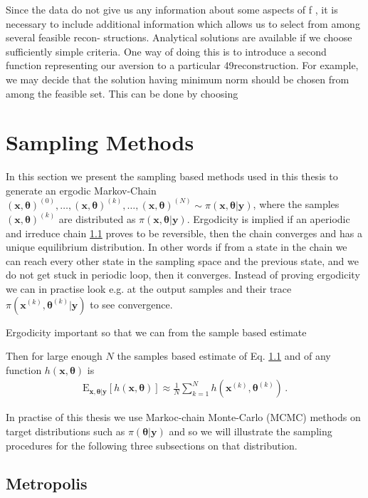 Since the data do not give us any information about some aspects of f , it is necessary to
include additional information which allows us to select from among several feasible recon-
structions. Analytical solutions are available if we choose sufficiently simple criteria. One way
of doing this is to introduce a second function representing our aversion to a particular
49reconstruction. For example, we may decide that the solution having minimum norm should
be chosen from among the feasible set. This can be done by choosing



\section{Sampling Methods}
In this section we present the sampling based methods used in this thesis to generate an ergodic Markov-Chain $ (\bm{x}, \bm{\theta} )^{(0)}, \dots, (\bm{x}, \bm{\theta} )^{(k)} , \dots,  (\bm{x}, \bm{\theta})^{(N)} \sim \pi(\bm{x},\bm{\theta}| \bm{y}) $, where the samples $(\bm{x}, \bm{\theta} )^{(k)}$ are distributed as $\pi(\bm{x},\bm{\theta}| \bm{y}) $.
Ergodicity is implied if an aperiodic and irreduce chain \ref{} proves to be reversible, then the chain converges and has a unique  equilibrium distribution.
In other words if from a state in the chain we can reach every other state in the sampling space and the previous state, and we do not get stuck in periodic loop, then it converges.
Instead of proving ergodicity we can in practise look e.g. at the output samples and their trace $\pi(\bm{x}^{(k)},\bm{\theta}^{(k)}| \bm{y})$ to see convergence.

Ergodicity important so that we can from the sample based estimate

Then for large enough $N$ the samples based estimate of Eq. \ref{} and of any function $h(\bm{x}, \bm{\theta})$ is
\begin{align}
	\label{eq:sampMean}
	\text{E}_{\bm{x},\bm{\theta}|\bm{y}} [h(\bm{x}, \bm{\theta})] \approx \frac{1}{N} \sum_{k=1}^{N} h(\bm{x}^{(k)},\bm{\theta}^{(k)}) \, .
\end{align}

In practise of this thesis we use Markoc-chain Monte-Carlo (MCMC) methods on target distributions such as $\pi(\bm{\theta}| \bm{y})$ and so we will illustrate the sampling procedures for the following three subsections on that distribution.

\subsection{Metropolis}

